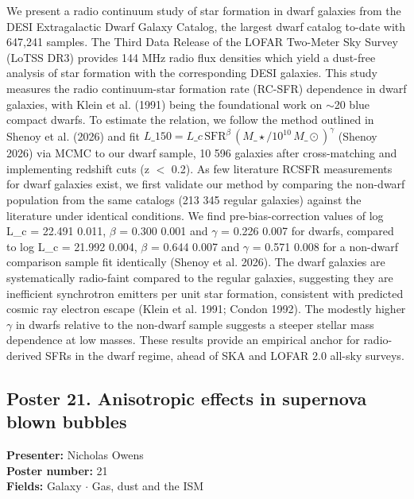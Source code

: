 We present a radio continuum study of star formation in dwarf galaxies from the DESI Extragalactic Dwarf Galaxy Catalog, the largest dwarf catalog to-date with 647,241 samples. The Third Data Release of the LOFAR Two-Meter Sky Survey (LoTSS DR3) provides 144 MHz radio flux densities which yield a dust-free analysis of star formation with the corresponding DESI galaxies. This study measures the radio continuum-star formation rate (RC-SFR) dependence in dwarf galaxies, with Klein et al. (1991) being the foundational work on $\sim$20 blue compact dwarfs. To estimate the relation, we follow the method outlined in Shenoy et al. (2026) and fit $L\_\mathrm{150} = L\_c\,\mathrm{SFR}^{\beta}\,(M\_\star/10^{10}\,M\_\odot)^{\gamma}$ (Shenoy 2026) via MCMC to our dwarf sample, 10 596 galaxies after cross-matching and implementing redshift cuts (z $<$ 0.2). As few literature RCSFR measurements for dwarf galaxies exist, we first validate our method by comparing the non-dwarf population from the same catalogs (213 345 regular galaxies) against the literature under identical conditions. We find pre-bias-correction values of log L\_c = 22.491 0.011, $\beta$ = 0.300 0.001 and $\gamma$ = 0.226 0.007 for dwarfs, compared to log L\_c = 21.992 0.004, $\beta$ = 0.644 0.007 and $\gamma$ = 0.571 0.008 for a non-dwarf comparison sample fit identically (Shenoy et al. 2026). The dwarf galaxies are systematically radio-faint compared to the regular galaxies, suggesting they are inefficient synchrotron emitters per unit star formation, consistent with predicted cosmic ray electron escape (Klein et al. 1991; Condon 1992). The modestly higher $\gamma$ in dwarfs relative to the non-dwarf sample suggests a steeper stellar mass dependence at low masses. These results provide an empirical anchor for radio-derived SFRs in the dwarf regime, ahead of SKA and LOFAR 2.0 all-sky surveys.

\hypertarget{poster-abstract-talk-208}{}\label{poster-abstract-page-talk-208}
\subsection*{Poster 21. Anisotropic effects in supernova blown bubbles}
\textbf{Presenter:} Nicholas Owens\\
\textbf{Poster number:} 21\\
\textbf{Fields:} Galaxy $\cdot$ Gas, dust and the ISM


